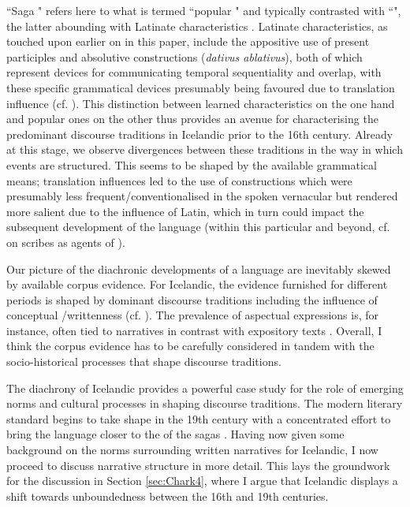 \documentclass[output=paper,colorlinks,citecolor=brown]{langscibook}
\begin{document}
``Saga " refers here to what is termed ``popular " and typically contrasted with ``", the latter abounding with Latinate characteristics \citep{nygaard1905norron, Kristjansson1985, hauksson1994islensk, smaari1920}. Latinate characteristics, as touched upon earlier on in this paper, include the appositive use of present participles and absolutive constructions (\textit{dativus ablativus}), both of which represent devices for communicating temporal sequentiality and overlap, with these specific grammatical devices presumably being favoured due to translation influence (cf. \citeauthor{brendel2023translation} \citeyear{brendel2023translation}). This distinction between learned characteristics on the one hand and popular ones on the other thus provides an avenue for characterising the predominant discourse traditions in Icelandic prior to the 16th century. Already at this stage, we observe divergences between these traditions in the way in which events are structured. This seems to be shaped by the available grammatical means; translation influences led to the use of constructions which were presumably less frequent/conventionalised in the spoken vernacular but rendered more salient due to the influence of Latin, which in turn could impact the subsequent development of the language (within this particular   and beyond, cf. \citeauthor{wagner2013scribes} \citeyear{wagner2013scribes} on scribes as agents of ).

Our picture of the diachronic developments of a language are inevitably skewed by available corpus evidence. For Icelandic, the evidence furnished for different periods is shaped by dominant discourse traditions including the influence of conceptual /writtenness (cf. \citeauthor{koch1985sprache} \citeyear{koch1985sprache}). The prevalence of aspectual expressions is, for instance, often tied to narratives in contrast with expository texts \citep{ragnarsdottir2002verbal}. Overall, I think the corpus evidence has to be carefully considered in tandem with the socio-historical processes that shape discourse traditions. 

The diachrony of Icelandic provides a powerful case study for the role of emerging norms and cultural processes in shaping discourse traditions. The modern literary standard begins to take shape in the 19th century with a concentrated effort to bring the language closer to the  of the sagas \citep{bernhardhsson2017jon, bernhardhsson2018spreading}. Having now given some background on the norms surrounding written narratives for Icelandic, I now proceed to discuss narrative structure in more detail. This lays the groundwork for the discussion in Section \ref{sec:Chark4}, where I argue that Icelandic displays a shift towards unboundedness between the 16th and 19th centuries.
\end{document}
